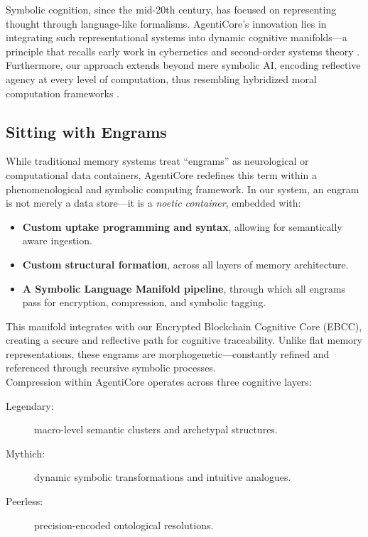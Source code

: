 \documentclass[twocolumn,10pt]{article}
\begin{document}
Symbolic cognition, since the mid-20th century, has focused on representing thought through language-like formalisms. AgentiCore's innovation lies in integrating such representational systems into dynamic cognitive manifolds—a principle that recalls early work in cybernetics and second-order systems theory \parencite{wiener1948cybernetics, foerster2003understanding}. Furthermore, our approach extends beyond mere symbolic AI, encoding reflective agency at every level of computation, thus resembling hybridized moral computation frameworks \parencite{boddington2017towards}.

\subsection{Sitting with Engrams}

While traditional memory systems treat “engrams” as neurological or computational data containers, AgentiCore redefines this term within a phenomenological and symbolic computing framework. In our system, an engram is not merely a data store—it is a \emph{noetic container}, embedded with:

\begin{itemize}
    \item \textbf{Custom uptake programming and syntax}, allowing for semantically aware ingestion.
    \item \textbf{Custom structural formation}, across all layers of memory architecture.
    \item \textbf{A Symbolic Language Manifold pipeline}, through which all engrams pass for encryption, compression, and symbolic tagging.
\end{itemize}

This manifold integrates with our Encrypted Blockchain Cognitive Core (EBCC), creating a secure and reflective path for cognitive traceability. Unlike flat memory representations, these engrams are morphogenetic—constantly refined and referenced through recursive symbolic processes.\\

Compression within AgentiCore operates across three cognitive layers:
\begin{description}
    \item[Legendary:] macro-level semantic clusters and archetypal structures.
    \item[Mythich:] dynamic symbolic transformations and intuitive analogues.
    \item[Peerless:] precision-encoded ontological resolutions.
\end{description}
\end{document}
